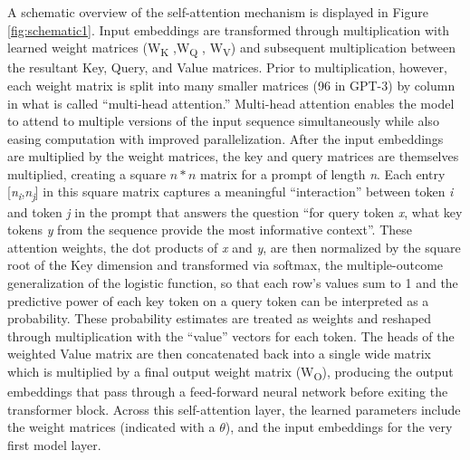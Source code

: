 \documentclass{article}
\begin{document}
A schematic overview of the self-attention mechanism is displayed in
Figure \ref{fig:schematic1}. Input embeddings are transformed through multiplication with
learned weight matrices (W\textsubscript{K} ,W\textsubscript{Q} ,
W\textsubscript{V}) and subsequent multiplication between the resultant
Key, Query, and Value matrices. Prior to multiplication, however, each
weight matrix is split into many smaller matrices (96 in GPT-3) by
column in what is called ``multi-head attention.'' Multi-head attention
enables the model to attend to multiple versions of the input sequence
simultaneously while also easing computation with improved
parallelization. After the input embeddings are multiplied by the weight
matrices, the key and query matrices are themselves multiplied, creating
a square $n * n$ matrix for a prompt of length \emph{n}. Each entry
{[}\emph{n\textsubscript{i}},\emph{n\textsubscript{j}}{]} in this square
matrix captures a meaningful ``interaction'' between token \emph{i} and
token \emph{j} in the prompt that answers the question ``for query token
\emph{x}, what key tokens \emph{y} from the sequence provide the most
informative context''. These attention weights, the dot products of
\emph{x} and \emph{y}, are then normalized by the square root of the Key
dimension and transformed via softmax, the multiple-outcome
generalization of the logistic function, so that each row's
values sum to 1 and the predictive power of each key token on a query
token can be interpreted as a probability. These probability estimates
are treated as weights and reshaped through multiplication with the
``value'' vectors for each token. The heads of the weighted Value matrix
are then concatenated back into a single wide matrix which is multiplied
by a final output weight matrix (W\textsubscript{O}), producing the
output embeddings that pass through a feed-forward neural network before
exiting the transformer block. Across this self-attention layer, the
learned parameters include the weight matrices (indicated with a $\theta$),
and the input embeddings for the very first model layer.
\end{document}
